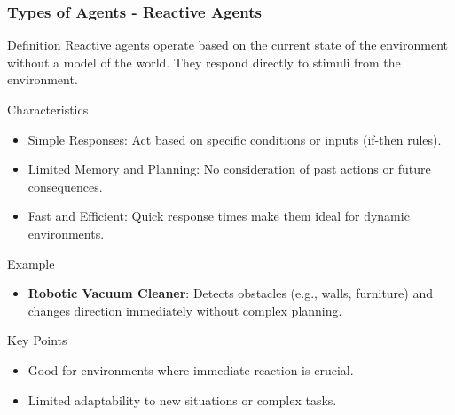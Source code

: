 \documentclass[aspectratio=169]{beamer}
\begin{document}
\begin{frame}[fragile]
    \frametitle{Types of Agents - Reactive Agents}
    \begin{block}{Definition}
        Reactive agents operate based on the current state of the environment without a model of the world. They respond directly to stimuli from the environment.
    \end{block}
    
    \begin{block}{Characteristics}
        \begin{itemize}
            \item Simple Responses: Act based on specific conditions or inputs (if-then rules).
            \item Limited Memory and Planning: No consideration of past actions or future consequences.
            \item Fast and Efficient: Quick response times make them ideal for dynamic environments.
        \end{itemize}
    \end{block}
    
    \begin{block}{Example}
        \begin{itemize}
            \item \textbf{Robotic Vacuum Cleaner}: Detects obstacles (e.g., walls, furniture) and changes direction immediately without complex planning.
        \end{itemize}
    \end{block}

    \begin{block}{Key Points}
        \begin{itemize}
            \item Good for environments where immediate reaction is crucial.
            \item Limited adaptability to new situations or complex tasks.
        \end{itemize}
    \end{block}
\end{frame}
\end{document}
